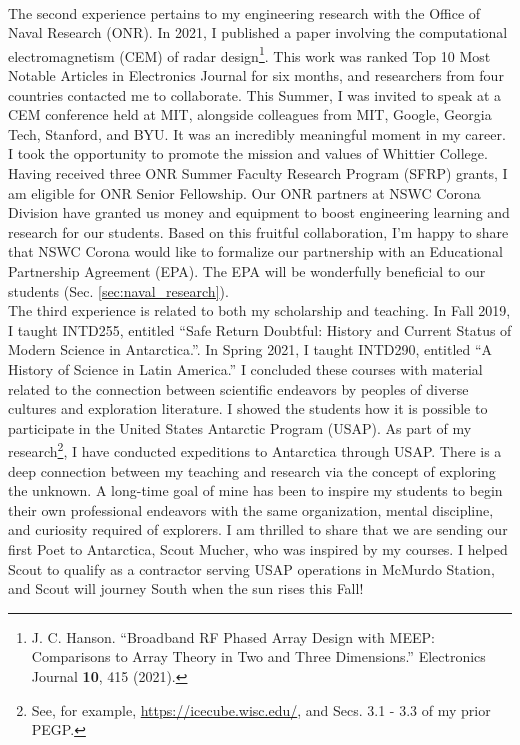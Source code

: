 \documentclass[../../main.tex]{subfiles}
\begin{document}
\\
\vspace{0.15cm}
The second experience pertains to my engineering research with the Office of Naval Research (ONR).  In 2021, I published a paper involving the computational electromagnetism (CEM) of radar design\footnote{J. C. Hanson.  ``Broadband RF Phased Array Design with MEEP: Comparisons to Array Theory in Two and Three Dimensions.'' Electronics Journal \textbf{10}, 415 (2021).}.  This work was ranked Top 10 Most Notable Articles in Electronics Journal for six months, and researchers from four countries contacted me to collaborate.  This Summer, I was invited to speak at a CEM conference held at MIT, alongside colleagues from MIT, Google, Georgia Tech, Stanford, and BYU.  It was an incredibly meaningful moment in my career.  I took the opportunity to promote the mission and values of Whittier College.  Having received three ONR Summer Faculty Research Program (SFRP) grants, I am eligible for ONR Senior Fellowship.  Our ONR partners at NSWC Corona Division have granted us money and equipment to boost engineering learning and research for our students.  Based on this fruitful collaboration, I'm happy to share that NSWC Corona would like to formalize our partnership with an Educational Partnership Agreement (EPA).  The EPA will be wonderfully beneficial to our students (Sec. \ref{sec:naval_research}).
\\
\vspace{0.15cm}
The third experience is related to both my scholarship and teaching.  In Fall 2019, I taught INTD255, entitled ``Safe Return Doubtful: History and Current Status of Modern Science in Antarctica.''.  In Spring 2021, I taught INTD290, entitled ``A History of Science in Latin America.''  I concluded these courses with material related to the connection between scientific endeavors by peoples of diverse cultures and exploration literature.  I showed the students how it is possible to participate in the United States Antarctic Program (USAP).  As part of my research\footnote{See, for example, \url{https://icecube.wisc.edu/}, and Secs. 3.1 - 3.3 of my prior PEGP.}, I have conducted expeditions to Antarctica through USAP.  There is a deep connection between my teaching and research via the concept of exploring the unknown.  A long-time goal of mine has been to inspire my students to begin their own professional endeavors with the same organization, mental discipline, and curiosity required of explorers.  I am thrilled to share that we are sending our first Poet to Antarctica, Scout Mucher, who was inspired by my courses.  I helped Scout to qualify as a contractor serving USAP operations in McMurdo Station, and Scout will journey South when the sun rises this Fall!
\end{document}
